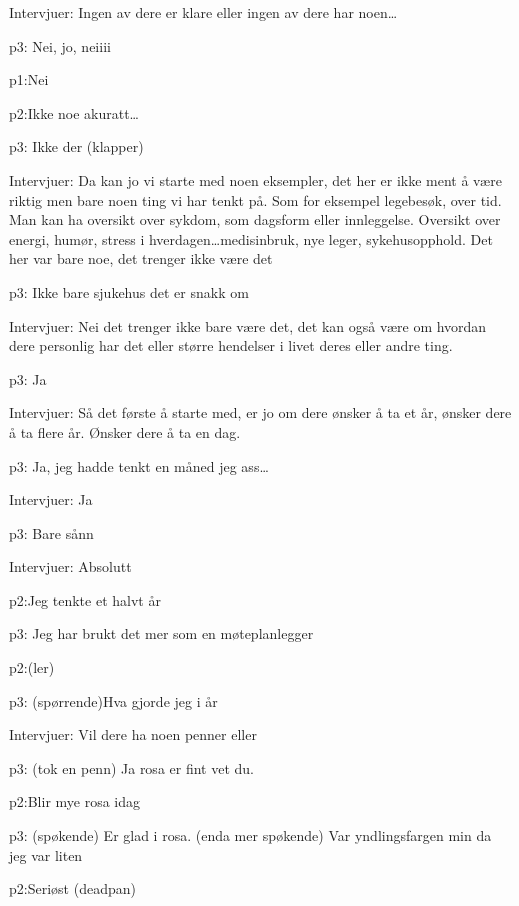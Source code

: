 \documentclass[11pt,UKenglish, a4paper]{article}
\begin{document}
\textcolor{myBlue} {Intervjuer:} Ingen av dere er klare eller ingen av dere har noen\dots

\textcolor{myR} {p3:} Nei, jo, neiiii 

\textcolor{myGreen} {p1:}Nei

\textcolor{myYellow} {p2:}Ikke noe akuratt\dots

\textcolor{myR} {p3:} Ikke der (klapper)

\textcolor{myBlue} {Intervjuer:} Da kan jo vi starte med noen eksempler, det her er ikke ment å være riktig men bare noen ting vi har tenkt på. Som for eksempel legebesøk, over tid. Man kan ha oversikt over sykdom, som dagsform eller innleggelse. Oversikt over energi, humør, stress i hverdagen\dots medisinbruk, nye leger, sykehusopphold. Det her var bare noe, det trenger ikke være det

\textcolor{myR} {p3:} Ikke bare sjukehus det er snakk om

\textcolor{myBlue} {Intervjuer:} Nei det trenger ikke bare være det, det kan også være om hvordan dere personlig har det eller større hendelser i livet deres eller andre ting. 

\textcolor{myR} {p3:} Ja

\textcolor{myBlue} {Intervjuer:} Så det første å starte med, er jo om dere ønsker å ta et år, ønsker dere å ta flere år. Ønsker dere å ta en dag.

\textcolor{myR} {p3:} Ja, jeg hadde tenkt en måned jeg ass\dots

\textcolor{myBlue} {Intervjuer:} Ja

\textcolor{myR} {p3:} Bare sånn

\textcolor{myBlue} {Intervjuer:} Absolutt

\textcolor{myYellow} {p2:}Jeg tenkte et halvt år

\textcolor{myR} {p3:} Jeg har brukt det mer som en møteplanlegger

\textcolor{myYellow} {p2:}(ler)

\textcolor{myR} {p3:} (spørrende)Hva gjorde jeg i år

\textcolor{myBlue} {Intervjuer:} Vil dere ha noen penner eller 

\textcolor{myR} {p3:} (tok en penn) Ja rosa er fint vet du.

\textcolor{myYellow} {p2:}Blir mye rosa idag

\textcolor{myR} {p3:} (spøkende) Er glad i rosa. (enda mer spøkende) Var yndlingsfargen min da jeg var liten

\textcolor{myYellow} {p2:}Seriøst (deadpan)
\end{document}
